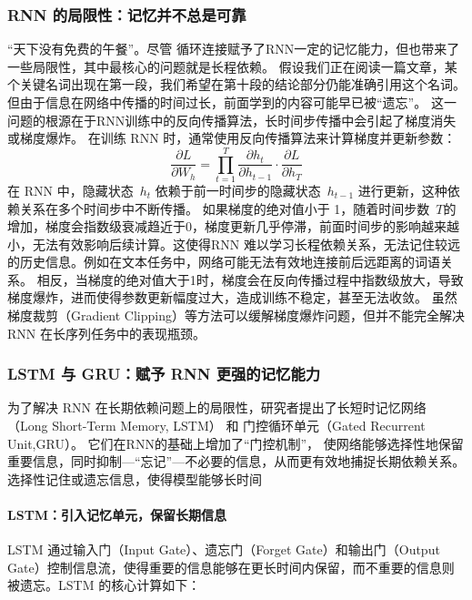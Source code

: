  \subsubsection{RNN 的局限性：记忆并不总是可靠}
“天下没有免费的午餐”。尽管 循环连接赋予了RNN一定的记忆能力，但也带来了一些局限性，其中最核心的问题就是长程依赖。
假设我们正在阅读一篇文章，某个关键名词出现在第一段，我们希望在第十段的结论部分仍能准确引用这个名词。但由于信息在网络中传播的时间过长，前面学到的内容可能早已被“遗忘”。
这一问题的根源在于RNN训练中的反向传播算法，长时间步传播中会引起了梯度消失或梯度爆炸。
在训练 RNN 时，通常使用反向传播算法来计算梯度并更新参数：
$$
\frac{\partial L}{\partial W_h} = \prod_{t=1}^T \frac{\partial h_t}{\partial h_{t-1}} \cdot \frac{\partial L}{\partial h_T}
$$
在 RNN 中，隐藏状态~$h_{t}$ 依赖于前一时间步的隐藏状态~$h_{t-1}$  进行更新，这种依赖关系在多个时间步中不断传播。
如果梯度的绝对值小于 1，随着时间步数~$T$的增加，梯度会指数级衰减趋近于0，梯度更新几乎停滞，前面时间步的影响越来越小，无法有效影响后续计算。这使得RNN 难以学习长程依赖关系，无法记住较远的历史信息。例如在文本任务中，网络可能无法有效地连接前后远距离的词语关系。
相反，当梯度的绝对值大于1时，梯度会在反向传播过程中指数级放大，导致梯度爆炸，进而使得参数更新幅度过大，造成训练不稳定，甚至无法收敛。 虽然梯度裁剪（Gradient Clipping）等方法可以缓解梯度爆炸问题，但并不能完全解决 RNN 在长序列任务中的表现瓶颈。
 \subsubsection{ LSTM 与 GRU：赋予 RNN 更强的记忆能力}

为了解决 RNN 在长期依赖问题上的局限性，研究者提出了长短时记忆网络（Long Short-Term Memory, LSTM） 和 门控循环单元（Gated Recurrent Unit,GRU）。 它们在RNN的基础上增加了“门控机制”， 使网络能够选择性地保留重要信息，同时抑制---“忘记”---不必要的信息，从而更有效地捕捉长期依赖关系。选择性记住或遗忘信息，使得模型能够长时间
\paragraph*{ LSTM：引入记忆单元，保留长期信息}
LSTM 通过输入门（Input Gate）、遗忘门（Forget Gate）和输出门（Output Gate）控制信息流，使得重要的信息能够在更长时间内保留，而不重要的信息则被遗忘。LSTM 的核心计算如下：

